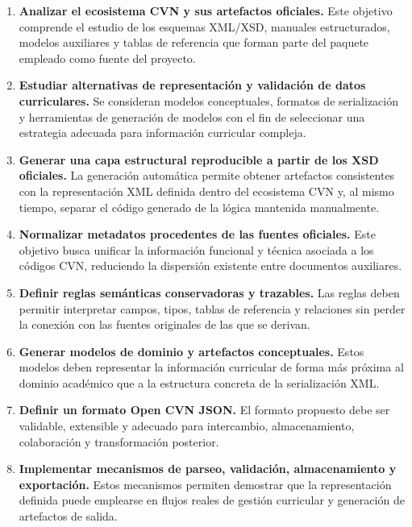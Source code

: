 \begin{enumerate}
  \item \textbf{Analizar el ecosistema CVN y sus artefactos oficiales.} Este
  objetivo comprende el estudio de los esquemas XML/XSD, manuales estructurados,
  modelos auxiliares y tablas de referencia que forman parte del paquete empleado
  como fuente del proyecto.

  \item \textbf{Estudiar alternativas de representación y validación de datos
  curriculares.} Se consideran modelos conceptuales, formatos de serialización y
  herramientas de generación de modelos con el fin de seleccionar una estrategia
  adecuada para información curricular compleja.

  \item \textbf{Generar una capa estructural reproducible a partir de los XSD
  oficiales.} La generación automática permite obtener artefactos consistentes con
  la representación XML definida dentro del ecosistema CVN y, al mismo tiempo,
  separar el código generado de la lógica mantenida manualmente.

  \item \textbf{Normalizar metadatos procedentes de las fuentes oficiales.} Este
  objetivo busca unificar la información funcional y técnica asociada a los
  códigos CVN, reduciendo la dispersión existente entre documentos auxiliares.

  \item \textbf{Definir reglas semánticas conservadoras y trazables.} Las reglas
  deben permitir interpretar campos, tipos, tablas de referencia y relaciones sin
  perder la conexión con las fuentes originales de las que se derivan.

  \item \textbf{Generar modelos de dominio y artefactos conceptuales.} Estos
  modelos deben representar la información curricular de forma más próxima al
  dominio académico que a la estructura concreta de la serialización XML.

  \item \textbf{Definir un formato Open CVN JSON.} El formato propuesto debe ser
  validable, extensible y adecuado para intercambio, almacenamiento, colaboración
  y transformación posterior.

  \item \textbf{Implementar mecanismos de parseo, validación, almacenamiento y
  exportación.} Estos mecanismos permiten demostrar que la representación definida
  puede emplearse en flujos reales de gestión curricular y generación de
  artefactos de salida.


\end{enumerate}
